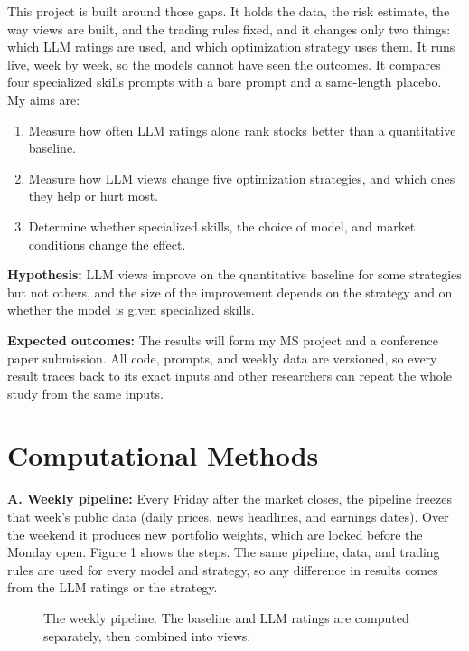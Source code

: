 \documentclass[11pt,letterpaper]{article}
\begin{document}
This project is built around those gaps. It holds the data, the risk estimate, the way views are built, and the trading rules fixed, and it changes only two things: which LLM ratings are used, and which optimization strategy uses them. It runs live, week by week, so the models cannot have seen the outcomes. It compares four specialized skills prompts with a bare prompt and a same-length placebo. My aims are:
\begin{enumerate}
\item[\textbf{1:}] Measure how often LLM ratings alone rank stocks better than a quantitative baseline.
\item[\textbf{2:}] Measure how LLM views change five optimization strategies, and which ones they help or hurt most.
\item[\textbf{3:}] Determine whether specialized skills, the choice of model, and market conditions change the effect.
\end{enumerate}
\textbf{Hypothesis:} LLM views improve on the quantitative baseline for some strategies but not others, and the size of the improvement depends on the strategy and on whether the model is given specialized skills.

\textbf{Expected outcomes:} The results will form my MS project and a conference paper submission. All code, prompts, and weekly data are versioned, so every result traces back to its exact inputs and other researchers can repeat the whole study from the same inputs.

\section{Computational Methods}
\textbf{A. Weekly pipeline:} Every Friday after the market closes, the pipeline freezes that week's public data (daily prices, news headlines, and earnings dates). Over the weekend it produces new portfolio weights, which are locked before the Monday open. Figure 1 shows the steps. The same pipeline, data, and trading rules are used for every model and strategy, so any difference in results comes from the LLM ratings or the strategy.

\begin{figure}[!t]\centering
{}
\caption{The weekly pipeline. The baseline and LLM ratings are computed separately, then combined into views.}
\end{figure}
\end{document}
